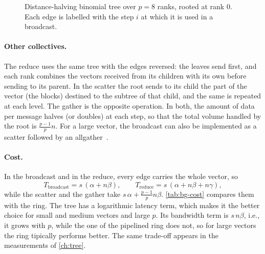 \begin{figure}[t]
  \centering
  \caption{Distance-halving binomial tree over $p=8$ ranks, rooted at rank $0$. Each edge is labelled with the step $i$ at which it is used in a broadcast.}
  \label{fig:bg-binomial}
\end{figure}

\paragraph{Other collectives.}
The reduce uses the same tree with the edges reversed: the leaves send first, and each rank combines the vectors received from its children with its own before sending to its parent.
In the scatter the root sends to its child the part of the vector (the blocks) destined to the subtree of that child, and the same is repeated at each level. The gather is the opposite operation.
In both, the amount of data per message halves (or doubles) at each step, so that the total volume handled by the root is $\tfrac{p-1}{p}n$.
For a large vector, the broadcast can also be implemented as a scatter followed by an allgather~\cite{thakur2005optimization}.

\paragraph{Cost.}
In the broadcast and in the reduce, every edge carries the whole vector, so
\begin{equation}
  T_{\text{broadcast}} = s\,(\alpha+n\beta),\qquad
  T_{\text{reduce}} = s\,(\alpha+n\beta+n\gamma),
  \label{eq:bg-tree-cost}
\end{equation}
while the scatter and the gather take $s\,\alpha+\tfrac{p-1}{p}n\beta$.
\cref{tab:bg-cost} compares them with the ring.
The tree has a logarithmic latency term, which makes it the better choice for small and medium vectors and large $p$.
Its bandwidth term is $s\,n\beta$, i.e., it grows with $p$, while the one of the pipelined ring does not, so for large vectors the ring tipically performs better.
The same trade-off appears in the measurements of \cref{ch:tree}.

